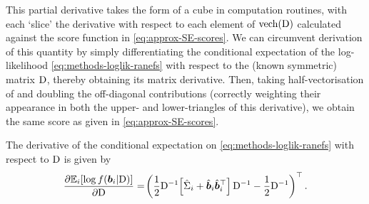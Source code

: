 This partial derivative takes the form of a cube in computation routines, with each `slice' the derivative with respect to each element of $\text{vech}\!\left(\mathrm{D}\right)$ calculated against the score function in \eqref{eq:approx-SE-scores}. We can circumvent derivation of this quantity by simply differentiating the conditional expectation of the log-likelihood \eqref{eq:methods-loglik-ranefs} with respect to the (known symmetric) matrix $\mathrm{D}$, thereby obtaining its matrix derivative. Then, taking half-vectorisation of and doubling the off-diagonal contributions (correctly weighting their appearance in both the upper- and lower-triangles of this derivative), we obtain the same score as given in \eqref{eq:approx-SE-scores}.

The derivative of the conditional expectation on \eqref{eq:methods-loglik-ranefs} with respect to $\mathrm{D}$ is given by
\begin{align}
    \frac{\partial\mathbb{E}_i\!\left[\log f\!\left(\bm{b}_i|\mathrm{D}\right)\right]}{\partial\mathrm{D}} = \!\left(
    \frac{1}{2}\mathrm{D}^{-1}\!\left[\hat{\Sigma}_i+\hat{\bm{b}}_i\hat{\bm{b}}_i^\top\right]\mathrm{D}^{-1}-
    \frac{1}{2}\mathrm{D}^{-1}
    \right)^\top.
\end{align}

